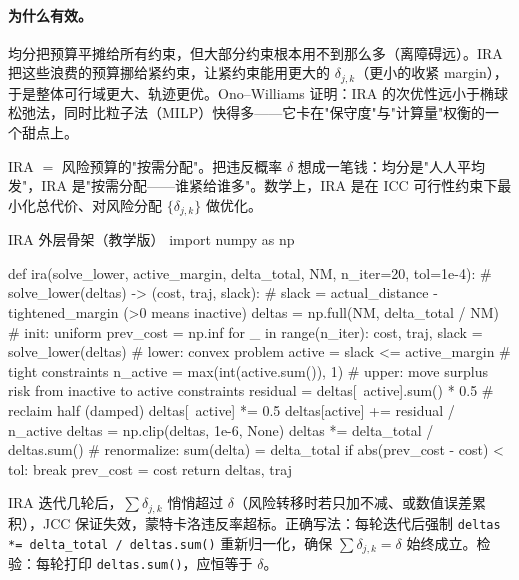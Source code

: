 \paragraph{为什么有效。}
均分把预算平摊给所有约束，但大部分约束根本用不到那么多（离障碍远）。IRA 把这些浪费的预算挪给紧约束，让紧约束能用更大的 $\delta_{j,k}$（更小的收紧 margin），于是整体可行域更大、轨迹更优。Ono--Williams\cite{ono2008iterative} 证明：IRA 的次优性远小于椭球松弛法，同时比粒子法（MILP）快得多——它卡在"保守度"与"计算量"权衡的一个甜点上。

\begin{insight}
IRA $=$ 风险预算的"按需分配"。把违反概率 $\delta$ 想成一笔钱：均分是"人人平均发"，IRA 是"按需分配——谁紧给谁多"。数学上，IRA 是在 ICC 可行性约束下最小化总代价、对风险分配 $\{\delta_{j,k}\}$ 做优化。
\end{insight}

\begin{codebox}[Python]{IRA 外层骨架（教学版）}
import numpy as np

def ira(solve_lower, active_margin, delta_total, NM, n_iter=20, tol=1e-4):
    # solve_lower(deltas) -> (cost, traj, slack):
    #   slack = actual_distance - tightened_margin (>0 means inactive)
    deltas = np.full(NM, delta_total / NM)         # init: uniform
    prev_cost = np.inf
    for _ in range(n_iter):
        cost, traj, slack = solve_lower(deltas)    # lower: convex problem
        active = slack <= active_margin            # tight constraints
        n_active = max(int(active.sum()), 1)
        # upper: move surplus risk from inactive to active constraints
        residual = deltas[~active].sum() * 0.5     # reclaim half (damped)
        deltas[~active] *= 0.5
        deltas[active]  += residual / n_active
        deltas = np.clip(deltas, 1e-6, None)
        deltas *= delta_total / deltas.sum()       # renormalize: sum(delta) = delta_total
        if abs(prev_cost - cost) < tol:
            break
        prev_cost = cost
    return deltas, traj
\end{codebox}

\begin{pitfall}
IRA 迭代几轮后，$\sum\delta_{j,k}$ 悄悄超过 $\delta$（风险转移时若只加不减、或数值误差累积），JCC 保证失效，蒙特卡洛违反率超标。正确写法：每轮迭代后强制 \texttt{deltas *= delta\_total / deltas.sum()} 重新归一化，确保 $\sum\delta_{j,k}=\delta$ 始终成立。检验：每轮打印 \texttt{deltas.sum()}，应恒等于 $\delta$。
\end{pitfall}

